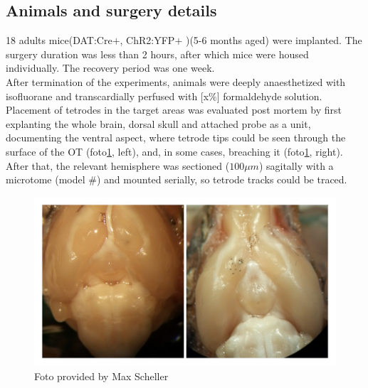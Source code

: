 \subsection{Animals and surgery details}
18 adults mice(DAT:Cre$+$, ChR2:YFP$+$ )(5-6 months aged) were implanted. The surgery duration was less than 2 hours, after which mice were housed individually. The recovery period was one week.\\
After termination of the experiments, animals were deeply anaesthetized with isofluorane and transcardially perfused with [x$\%$] formaldehyde solution. Placement of tetrodes in the target areas was evaluated post mortem by first explanting the whole brain, dorsal skull and attached probe as a unit, documenting the ventral aspect, where tetrode tips could be seen through the surface of the OT (foto\ref{fig:surgery}, left), and, in some cases, breaching it (foto\ref{fig:surgery}, right). After that, the relevant hemisphere was sectioned ($100 \mu m$) sagitally with a microtome (model \#) and mounted serially, so tetrode tracks could be traced.
\begin{figure}[h!]
    \centering
    \includegraphics[scale=0.2]{figures/surgery_3.jpg}
    \caption{Foto provided by Max Scheller}
    \label{fig:surgery}
\end{figure}
